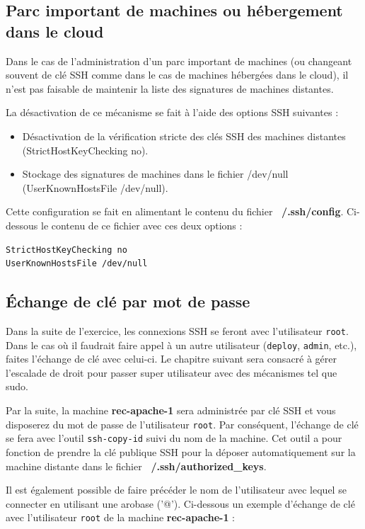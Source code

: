 \documentclass[hidelinks]{article}
\begin{document}
\subsection{Parc important de machines ou hébergement dans le cloud}

Dans le cas de l'administration d'un parc important de machines (ou changeant souvent de clé SSH comme dans le cas de machines hébergées dans le cloud), il n'est pas faisable de maintenir la liste des signatures de machines distantes.

La désactivation de ce mécanisme se fait à l'aide des options SSH suivantes :
\begin{itemize}
    \item Désactivation de la vérification stricte des clés SSH des machines distantes (StrictHostKeyChecking no).
    \item Stockage des signatures de machines dans le fichier /dev/null (UserKnownHostsFile /dev/null).
\end{itemize}

Cette configuration se fait en alimentant le contenu du fichier \textbf{~/.ssh/config}. Ci-dessous le contenu de ce fichier avec ces deux options :

\begin{verbatim}
StrictHostKeyChecking no 
UserKnownHostsFile /dev/null
\end{verbatim}


\subsection{Échange de clé par mot de passe}
Dans la suite de l'exercice, les connexions SSH se feront avec l'utilisateur \texttt{root}. Dans le cas où il faudrait faire appel à un autre utilisateur (\texttt{deploy}, \texttt{admin}, etc.), faites l'échange de clé avec celui-ci. Le chapitre suivant sera consacré à gérer l'escalade de droit pour passer super utilisateur avec des mécanismes tel que sudo.

Par la suite, la machine \textbf{rec-apache-1} sera administrée par clé SSH et vous disposerez du mot de passe de l'utilisateur \texttt{root}. Par conséquent, l'échange de clé se fera avec l'outil \texttt{ssh-copy-id} suivi du nom de la machine. Cet outil a pour fonction de prendre la clé publique SSH pour la déposer automatiquement sur la machine distante dans le fichier \textbf{~/.ssh/authorized_keys}.

Il est également possible de faire précéder le nom de l'utilisateur avec lequel se connecter en utilisant une arobase ('@'). Ci-dessous un exemple d'échange de clé avec l'utilisateur \texttt{root} de la machine \textbf{rec-apache-1} :
\end{document}
